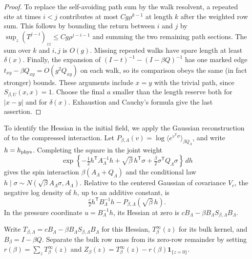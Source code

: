 \documentclass[11pt]{article}
\theoremstyle{definition}
\newcommand{\one}{\mathbf 1}
\begin{document}
\begin{proof}
To replace the self-avoiding path sum by the walk resolvent,
a repeated site at times \(i<j\) contributes at most
\(Cg\rho^{k-1}\) at length \(k\) after the weighted row sum.
This follows by bounding the return between \(i\) and \(j\)
by \(\sup_z (T^{j-i})_{zz}\le Cg\rho^{j-i-1}\) and
summing the two remaining path sections. The sum over \(k\)
and \(i,j\) is \(O(g)\). Missing repeated walks have spare
length at least \(\delta(x)\). Finally, the expansion of
\((I-t)^{-1}-(I-\beta Q)^{-1}\) has one marked edge
\(t_{xy}-\beta Q_{xy}=O(g^2 Q_{xy})\) on each walk,
so its comparison obeys the same (in fact stronger) bounds.
These arguments include \(x=y\) with the trivial path, since
\(S_{\beta,U}(x,x)=1\). Choose the final \(a\) smaller than
the length reserve both for \(|x-y|\) and for \(\delta(x)\).
Exhaustion and Cauchy's formula give the last assertion.
\end{proof}

To identify the Hessian in the initial field, we apply the Gaussian
reconstruction of \cite[Proposition~2.4 and Section~17]{IsingCorrelation}
to the compressed interaction. Let \(P_{\beta,\Lambda}(v)=\log\langle
 e^{v^{\mathsf T}\sigma}\rangle_{\beta Q_\Lambda}\), and write
\(h=h_{\rm phys}\). Completing the square in the joint weight
\begin{equation}
 \exp\!\left\{-\tfrac12h^{\mathsf T}A_\Lambda^{-1}h
       +\sqrt\beta\,h^{\mathsf T}\sigma
       +\tfrac\beta2\sigma^{\mathsf T}Q_\Lambda\sigma\right\}\,dh
\end{equation}
gives the spin interaction \(\beta(A_\Lambda+Q_\Lambda)\) and the
conditional law \(h\mid\sigma\sim N(\sqrt\beta A_\Lambda\sigma,A_\Lambda)\).
Relative to the centered Gaussian of covariance \(V_c\), the negative
log density of \(h\), up to an additive constant, is
\begin{equation}
 \tfrac c2h^{\mathsf T}B_\Lambda^{-1}h-P_{\beta,\Lambda}(\sqrt\beta\,h).
\end{equation}
In the pressure coordinate \(u=B_\Lambda^{-1}h\), its Hessian at zero
is \(cB_\Lambda-\beta B_\Lambda S_{\beta,\Lambda}B_\Lambda\).

Write \(T_{\beta,\Lambda}=cB_\Lambda-\beta B_\Lambda S_{\beta,\Lambda}B_\Lambda\)
for this Hessian, \(T_\beta^\infty(z)\) for its bulk kernel, and
\(B_\beta=I-\beta Q\). Separate the bulk row mass from its zero-row
remainder by setting \(r(\beta)=\sum_z T_\beta^\infty(z)\) and
\(Z_\beta(z)=T_\beta^\infty(z)-r(\beta)\one_{\{z=0\}}\).
\end{document}
